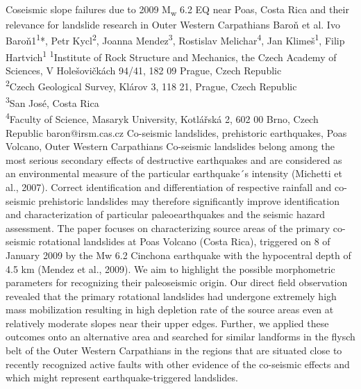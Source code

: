 \abstract
{Coseismic slope failures due to 2009 M\textsubscript{w} 6.2 EQ near Poas, Costa Rica and their relevance for landslide research in Outer Western Carpathians} 
{Baroň et al.} 
{Ivo Baroň1\textsuperscript{1}*, Petr Kycl\textsuperscript{2}, Joanna Mendez\textsuperscript{3}, Rostislav Melichar\textsuperscript{4}, Jan Klimeš\textsuperscript{1}, Filip Hartvich\textsuperscript{1}} 
{\TLtag} 
{
\textsuperscript{1}Institute of Rock Structure and Mechanics, the Czech Academy of Sciences, V Holešovičkách 94/41, 182 09 Prague, Czech Republic\\
\textsuperscript{2}Czech Geological Survey, Klárov 3, 118 21, Prague, Czech Republic\\
\textsuperscript{3}San José, Costa Rica\\
\textsuperscript{4}Faculty of Science, Masaryk University, Kotlářská 2, 602 00 Brno, Czech Republic
}
{baron@irsm.cas.cz}  %
{Co-seismic landslides, prehistoric earthquakes, Poas Volcano, Outer Western Carpathians}
{Co-seismic landslides belong among the most serious secondary effects of destructive earthquakes and are considered as an environmental measure of the particular earthquake´s intensity (Michetti et al., 2007). Correct identification and differentiation of respective rainfall and co-seismic prehistoric landslides may therefore significantly improve identification and characterization of particular paleoearthquakes and the seismic hazard assessment. The paper focuses on characterizing source areas of the primary co-seismic rotational landslides at Poas Volcano (Costa Rica), triggered on 8 of January 2009 by the Mw 6.2 Cinchona earthquake with the hypocentral depth of 4.5 km (Mendez et al., 2009). We aim to highlight the possible morphometric parameters for recognizing their paleoseismic origin. Our direct field observation revealed that the primary rotational landslides had undergone extremely high mass mobilization resulting in high depletion rate of the source areas even at relatively moderate slopes near their upper edges. Further, we applied these outcomes onto an alternative area and searched for similar landforms in the flysch belt of the Outer Western Carpathians in the regions that are situated close to recently recognized active faults with other evidence of the co-seismic effects and which might represent earthquake-triggered landslides.
}
